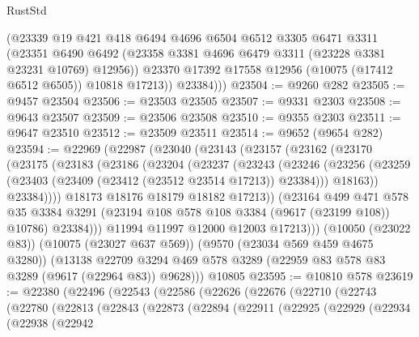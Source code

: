\begin{lexlean}{RustStd}
\begin{coremodule}
            (@23339
              @19
              @421
              @418
              @6494
              @4696
              @6504
              @6512
              @3305
              @6471
              @3311
              (@23351
                @6490
                @6492
                (@23358 @3381 @4696 @6479 @3311 (@23228 @3381 @23231 @10769) @12956))
              @23370
              @17392
              @17558
              @12956
              (@10075 (@17412 @6512 @6505))
              @10818
              @17213))
          @23384)))
@23504 := @9260 @282
@23505 := @9457 @23504
@23506 := @23503 @23505
@23507 := @9331 @2303
@23508 := @9643 @23507
@23509 := @23506 @23508
@23510 := @9355 @2303
@23511 := @9647 @23510
@23512 := @23509 @23511
@23514 := @9652 (@9654 @282)
@23594 := @22969
    (@22987
      (@23040
        (@23143
          (@23157
            (@23162
              (@23170
                (@23175
                  (@23183
                    (@23186
                      (@23204
                        (@23237
                          (@23243
                            (@23246
                              (@23256
                                (@23259 (@23403 (@23409 (@23412 (@23512 @23514 @17213)) @23384)))
                                @18163))
                            @23384))))
                    @18173
                    @18176
                    @18179
                    @18182
                    @17213))
                (@23164
                  @499
                  @471
                  @578
                  @35
                  @3384
                  @3291
                  (@23194 @108 @578 @108 @3384 (@9617 (@23199 @108)) @10786)
                  @23384)))
            @11994
            @11997
            @12000
            @12003
            @17213)))
      (@10050 (@23022 @83))
      (@10075 (@23027 @637 @569))
      (@9570 (@23034 @569 @459 @4675 @3280))
      (@13138 @22709 @3294 @469 @578 @3289 (@22959 @83 @578 @83 @3289 (@9617 (@22964 @83)) @9628)))
    @10805
@23595 := @10810 @578
@23619 := @22380
    (@22496
      (@22543
        (@22586
          (@22626
            (@22676
              (@22710
                (@22743
                  (@22780
                    (@22813
                      (@22843
                        (@22873
                          (@22894
                            (@22911
                              (@22925
                                (@22929
                                  (@22934
                                    (@22938
                                      (@22942

\end{coremodule}
\end{lexlean}

